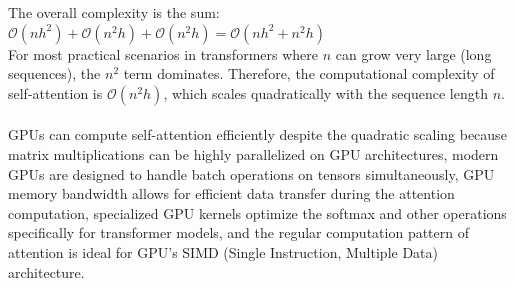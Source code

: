 {The overall complexity is the sum: $\mathcal{O}(nh^2) + \mathcal{O}(n^2h) + \mathcal{O}(n^2h) = \mathcal{O}(nh^2 + n^2h)$ \\
For most practical scenarios in transformers where $n$ can grow very large (long sequences), the $n^2$ term dominates. Therefore, the computational complexity of self-attention is $\mathcal{O}(n^2h)$, which scales quadratically with the sequence length $n$.
\\ \\
GPUs can compute self-attention efficiently despite the quadratic scaling because matrix multiplications can be highly parallelized on GPU architectures, modern GPUs are designed to handle batch operations on tensors simultaneously, GPU memory bandwidth allows for efficient data transfer during the attention computation, specialized GPU kernels optimize the softmax and other operations specifically for transformer models, and the regular computation pattern of attention is ideal for GPU's SIMD (Single Instruction, Multiple Data) architecture.}



